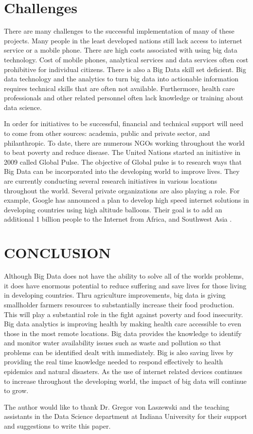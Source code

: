 \documentclass[sigconf]{acmart}
\begin{document}
\section{Challenges}
There are many challenges to the successful implementation of many of these projects.  Many people in the least developed nations still lack access to internet service or a mobile phone. There are high costs associated with using big data technology. Cost of mobile phones, analytical services and data services often cost prohibitive for individual citizens. There is also a Big Data skill set deficient. Big data technology and the analytics to turn big data into actionable information requires technical skills that are often not available. Furthermore, health care professionals and other related personnel often lack knowledge or training about data science. 

In order for initiatives to be successful, financial and technical support will need to come from other sources: academia, public and private sector, and philanthropic. To date, there are numerous NGOs working throughout the world to beat poverty and reduce disease. The United Nations started an initiative in 2009 called Global Pulse. The objective of Global pulse is to research ways that Big Data can be incorporated into the developing world to improve lives. They are currently conducting several research initiatives in various locations throughout the world. Several private organizations are also playing a role. For example, Google has announced a plan to develop high speed internet solutions in developing countries using high altitude balloons. Their goal is to add an additional 1 billion people to the Internet from Africa, and Southwest Asia \cite{DevEcon}. 

\section{CONCLUSION}

Although Big Data does not have the ability to solve all of the worlds problems, it does have enormous potential to reduce suffering and save lives for those living in developing countries. Thru agriculture improvements, big data is giving smallholder farmers resources to substantially increase their food production. This will play a substantial role in the fight against poverty and food insecurity. Big data analytics is improving health by making health care accessible to even those in the most remote locations. Big data provides the knowledge to identify and monitor water availability issues such as waste and pollution so that problems can be identified dealt with immediately. Big is also saving lives by providing the real time knowledge needed to respond effectively to health epidemics and natural disasters. As the use of internet related devices continues to increase throughout the developing world, the impact of big data will continue to grow.   







\begin{acks}

  The author would like to thank Dr. Gregor von Laszewski and the teaching assistants in the Data Science department at Indiana University for their support and suggestions to write this paper.

\end{acks}




 
\end{document}
